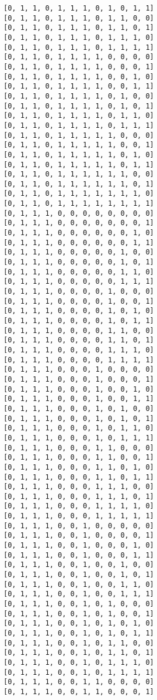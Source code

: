 \documentclass[11pt]{article}
\begin{document}
\begin{Verbatim}[commandchars=\\\{\}]
[0, 1, 1, 0, 1, 1, 1, 0, 1, 0, 1, 1]
[0, 1, 1, 0, 1, 1, 1, 0, 1, 1, 0, 0]
[0, 1, 1, 0, 1, 1, 1, 0, 1, 1, 0, 1]
[0, 1, 1, 0, 1, 1, 1, 0, 1, 1, 1, 0]
[0, 1, 1, 0, 1, 1, 1, 0, 1, 1, 1, 1]
[0, 1, 1, 0, 1, 1, 1, 1, 0, 0, 0, 0]
[0, 1, 1, 0, 1, 1, 1, 1, 0, 0, 0, 1]
[0, 1, 1, 0, 1, 1, 1, 1, 0, 0, 1, 0]
[0, 1, 1, 0, 1, 1, 1, 1, 0, 0, 1, 1]
[0, 1, 1, 0, 1, 1, 1, 1, 0, 1, 0, 0]
[0, 1, 1, 0, 1, 1, 1, 1, 0, 1, 0, 1]
[0, 1, 1, 0, 1, 1, 1, 1, 0, 1, 1, 0]
[0, 1, 1, 0, 1, 1, 1, 1, 0, 1, 1, 1]
[0, 1, 1, 0, 1, 1, 1, 1, 1, 0, 0, 0]
[0, 1, 1, 0, 1, 1, 1, 1, 1, 0, 0, 1]
[0, 1, 1, 0, 1, 1, 1, 1, 1, 0, 1, 0]
[0, 1, 1, 0, 1, 1, 1, 1, 1, 0, 1, 1]
[0, 1, 1, 0, 1, 1, 1, 1, 1, 1, 0, 0]
[0, 1, 1, 0, 1, 1, 1, 1, 1, 1, 0, 1]
[0, 1, 1, 0, 1, 1, 1, 1, 1, 1, 1, 0]
[0, 1, 1, 0, 1, 1, 1, 1, 1, 1, 1, 1]
[0, 1, 1, 1, 0, 0, 0, 0, 0, 0, 0, 0]
[0, 1, 1, 1, 0, 0, 0, 0, 0, 0, 0, 1]
[0, 1, 1, 1, 0, 0, 0, 0, 0, 0, 1, 0]
[0, 1, 1, 1, 0, 0, 0, 0, 0, 0, 1, 1]
[0, 1, 1, 1, 0, 0, 0, 0, 0, 1, 0, 0]
[0, 1, 1, 1, 0, 0, 0, 0, 0, 1, 0, 1]
[0, 1, 1, 1, 0, 0, 0, 0, 0, 1, 1, 0]
[0, 1, 1, 1, 0, 0, 0, 0, 0, 1, 1, 1]
[0, 1, 1, 1, 0, 0, 0, 0, 1, 0, 0, 0]
[0, 1, 1, 1, 0, 0, 0, 0, 1, 0, 0, 1]
[0, 1, 1, 1, 0, 0, 0, 0, 1, 0, 1, 0]
[0, 1, 1, 1, 0, 0, 0, 0, 1, 0, 1, 1]
[0, 1, 1, 1, 0, 0, 0, 0, 1, 1, 0, 0]
[0, 1, 1, 1, 0, 0, 0, 0, 1, 1, 0, 1]
[0, 1, 1, 1, 0, 0, 0, 0, 1, 1, 1, 0]
[0, 1, 1, 1, 0, 0, 0, 0, 1, 1, 1, 1]
[0, 1, 1, 1, 0, 0, 0, 1, 0, 0, 0, 0]
[0, 1, 1, 1, 0, 0, 0, 1, 0, 0, 0, 1]
[0, 1, 1, 1, 0, 0, 0, 1, 0, 0, 1, 0]
[0, 1, 1, 1, 0, 0, 0, 1, 0, 0, 1, 1]
[0, 1, 1, 1, 0, 0, 0, 1, 0, 1, 0, 0]
[0, 1, 1, 1, 0, 0, 0, 1, 0, 1, 0, 1]
[0, 1, 1, 1, 0, 0, 0, 1, 0, 1, 1, 0]
[0, 1, 1, 1, 0, 0, 0, 1, 0, 1, 1, 1]
[0, 1, 1, 1, 0, 0, 0, 1, 1, 0, 0, 0]
[0, 1, 1, 1, 0, 0, 0, 1, 1, 0, 0, 1]
[0, 1, 1, 1, 0, 0, 0, 1, 1, 0, 1, 0]
[0, 1, 1, 1, 0, 0, 0, 1, 1, 0, 1, 1]
[0, 1, 1, 1, 0, 0, 0, 1, 1, 1, 0, 0]
[0, 1, 1, 1, 0, 0, 0, 1, 1, 1, 0, 1]
[0, 1, 1, 1, 0, 0, 0, 1, 1, 1, 1, 0]
[0, 1, 1, 1, 0, 0, 0, 1, 1, 1, 1, 1]
[0, 1, 1, 1, 0, 0, 1, 0, 0, 0, 0, 0]
[0, 1, 1, 1, 0, 0, 1, 0, 0, 0, 0, 1]
[0, 1, 1, 1, 0, 0, 1, 0, 0, 0, 1, 0]
[0, 1, 1, 1, 0, 0, 1, 0, 0, 0, 1, 1]
[0, 1, 1, 1, 0, 0, 1, 0, 0, 1, 0, 0]
[0, 1, 1, 1, 0, 0, 1, 0, 0, 1, 0, 1]
[0, 1, 1, 1, 0, 0, 1, 0, 0, 1, 1, 0]
[0, 1, 1, 1, 0, 0, 1, 0, 0, 1, 1, 1]
[0, 1, 1, 1, 0, 0, 1, 0, 1, 0, 0, 0]
[0, 1, 1, 1, 0, 0, 1, 0, 1, 0, 0, 1]
[0, 1, 1, 1, 0, 0, 1, 0, 1, 0, 1, 0]
[0, 1, 1, 1, 0, 0, 1, 0, 1, 0, 1, 1]
[0, 1, 1, 1, 0, 0, 1, 0, 1, 1, 0, 0]
[0, 1, 1, 1, 0, 0, 1, 0, 1, 1, 0, 1]
[0, 1, 1, 1, 0, 0, 1, 0, 1, 1, 1, 0]
[0, 1, 1, 1, 0, 0, 1, 0, 1, 1, 1, 1]
[0, 1, 1, 1, 0, 0, 1, 1, 0, 0, 0, 0]
[0, 1, 1, 1, 0, 0, 1, 1, 0, 0, 0, 1]

\end{Verbatim}
\end{document}
